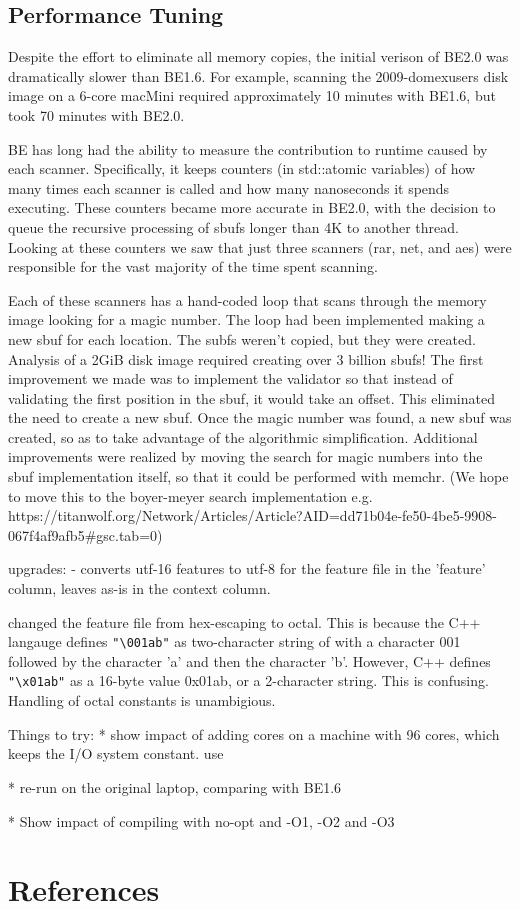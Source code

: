 \documentclass[5p]{elsarticle}
\begin{document}
\subsection{Performance Tuning}
Despite the effort to eliminate all memory copies, the initial verison
of BE2.0 was dramatically slower than BE1.6. For example, scanning the
2009-domexusers disk image on a 6-core macMini required approximately 10 minutes
with BE1.6, but took 70 minutes with BE2.0.

BE has long had the ability to measure the contribution to runtime
caused by each scanner. Specifically, it keeps counters (in
std::atomic variables) of how many times each scanner is called and
how many nanoseconds it spends executing. These counters became more
accurate in BE2.0, with the decision to queue the recursive processing
of sbufs longer than 4K to another thread. Looking at these counters
we saw that just three scanners (rar, net, and aes) were responsible
for the vast majority of the time spent scanning.

Each of these scanners has a hand-coded loop that scans through the
memory image looking for a magic number. The loop had been implemented
making a new sbuf for each location. The subfs weren't copied, but
they were created.  Analysis of a 2GiB disk image required creating
over 3 billion sbufs!  The first improvement we made was to implement
the validator so that instead of validating the first position in the
sbuf, it would take an offset. This eliminated the need to create a
new sbuf. Once the magic number was found, a new sbuf was created, so
as to take advantage of the algorithmic simplification. Additional
improvements were realized by moving the search for magic numbers into
the sbuf implementation itself, so that it could be performed with
memchr. (We hope to move this to the boyer-meyer search implementation
e.g. https://titanwolf.org/Network/Articles/Article?AID=dd71b04e-fe50-4be5-9908-067f4af9afb5#gsc.tab=0)


upgrades:
- converts utf-16 features to utf-8 for the feature file in the
'feature' column, leaves as-is in the context column.

changed the feature file from hex-escaping to octal. This is because
the C++ langauge defines \verb+"\001ab"+ as two-character string of
with a character 001 followed by the character 'a' and then the
character 'b'. However, C++ defines \verb+"\x01ab"+ as a 16-byte value
0x01ab, or a 2-character string. This is confusing. Handling of octal
constants is unambigious.


Things to try:
* show impact of adding cores on a machine with 96 cores, which keeps
the I/O system constant.  use

* re-run on the original laptop, comparing with BE1.6

* Show impact of compiling with no-opt and -O1, -O2 and -O3

\section*{References}


\end{document}
